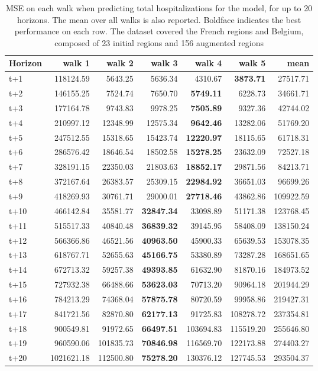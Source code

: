 \begin{table}[H]
\centering
\caption{MSE on each walk when predicting total hospitalizations for the model, for up to 20 horizons. The mean over all walks is also reported. Boldface indicates the best performance on each row. The dataset covered the French regions and Belgium, composed of 23 initial regions and 156 augmented regions }
\label{tab:MSE_walk_custom_linear_regression}
\begin{tabular}{lrrrrrr}
\toprule
Horizon &     walk 1 &    walk 2 &   walk 3 &    walk 4 &    walk 5 &      mean \\
\midrule
t+1  & 118124.59  & 5643.25  & 5636.34  & 4310.67  & \textbf{3873.71}  & 27517.71  \\
t+2  & 146155.25  & 7524.74  & 7650.70  & \textbf{5749.11}  & 6228.73  & 34661.71  \\
t+3  & 177164.78  & 9743.83  & 9978.25  & \textbf{7505.89}  & 9327.36  & 42744.02  \\
t+4  & 210997.12  & 12348.99  & 12575.34  & \textbf{9642.46}  & 13282.06  & 51769.20  \\
t+5  & 247512.55  & 15318.65  & 15423.74  & \textbf{12220.97}  & 18115.65  & 61718.31  \\
t+6  & 286576.42  & 18646.54  & 18502.58  & \textbf{15278.25}  & 23632.09  & 72527.18  \\
t+7  & 328191.15  & 22350.03  & 21803.63  & \textbf{18852.17}  & 29871.56  & 84213.71  \\
t+8  & 372167.64  & 26383.57  & 25309.15  & \textbf{22984.92}  & 36651.03  & 96699.26  \\
t+9  & 418269.93  & 30761.71  & 29000.01  & \textbf{27718.46}  & 43862.86  & 109922.59  \\
t+10  & 466142.84  & 35581.77  & \textbf{32847.34}  & 33098.89  & 51171.38  & 123768.45  \\
t+11  & 515517.33  & 40840.48  & \textbf{36839.32}  & 39145.95  & 58408.09  & 138150.24  \\
t+12  & 566366.86  & 46521.56  & \textbf{40963.50}  & 45900.33  & 65639.53  & 153078.35  \\
t+13  & 618767.71  & 52655.63  & \textbf{45166.75}  & 53380.89  & 73287.28  & 168651.65  \\
t+14  & 672713.32  & 59257.38  & \textbf{49393.85}  & 61632.90  & 81870.16  & 184973.52  \\
t+15  & 727932.38  & 66488.66  & \textbf{53623.03}  & 70713.20  & 90964.18  & 201944.29  \\
t+16  & 784213.29  & 74368.04  & \textbf{57875.78}  & 80720.59  & 99958.86  & 219427.31  \\
t+17  & 841721.56  & 82870.80  & \textbf{62177.13}  & 91725.83  & 108278.72  & 237354.81  \\
t+18  & 900549.81  & 91972.65  & \textbf{66497.51}  & 103694.83  & 115519.20  & 255646.80  \\
t+19  & 960590.06  & 101835.73  & \textbf{70846.98}  & 116569.70  & 122173.88  & 274403.27  \\
t+20  & 1021621.18  & 112500.80  & \textbf{75278.20}  & 130376.12  & 127745.53  & 293504.37  \\

\bottomrule
\end{tabular}
\end{table}
